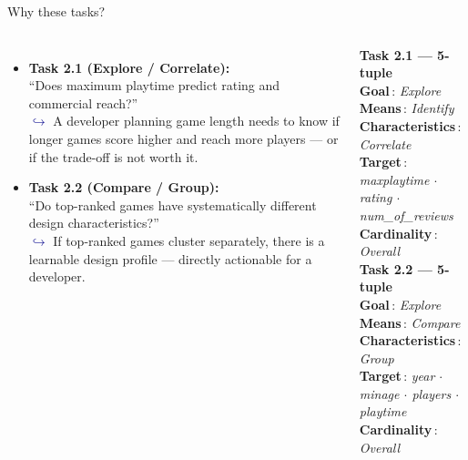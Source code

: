 \documentclass[aspectratio=169, 11pt]{beamer}
\newcommand{\tuplerow}[2]{%
  \textbf{#1}\,: \textit{#2}\\[1pt]%
}
\begin{document}
\begin{frame}[t]{Why these tasks?}

\begin{columns}[T]
  \begin{itemize}\setlength\itemsep{6pt}
    \item \textbf{Task 2.1 (Explore / Correlate):}\\
          ``Does maximum playtime predict rating and commercial reach?''\\
          \textcolor{darkblue}{$\hookrightarrow$} A developer planning game length needs to know if longer games score higher and reach more players — or if the trade-off is not worth it.

    \item \textbf{Task 2.2 (Compare / Group):}\\
          ``Do top-ranked games have systematically different design characteristics?''\\
          \textcolor{darkblue}{$\hookrightarrow$} If top-ranked games cluster separately, there is a learnable design profile — directly actionable for a developer.
  \end{itemize}

  \small
  \vspace{2pt}
  \textbf{Task 2.1 — 5-tuple}\\[2pt]
  \tuplerow{Goal}{Explore}
  \tuplerow{Means}{Identify}
  \tuplerow{Characteristics}{Correlate}
  \tuplerow{Target}{maxplaytime $\cdot$ rating $\cdot$ num\_of\_reviews}
  \tuplerow{Cardinality}{Overall}

  \vspace{8pt}
  \textbf{Task 2.2 — 5-tuple}\\[2pt]
  \tuplerow{Goal}{Explore}
  \tuplerow{Means}{Compare}
  \tuplerow{Characteristics}{Group}
  \tuplerow{Target}{year $\cdot$ minage $\cdot$ players $\cdot$ playtime}
  \tuplerow{Cardinality}{Overall}
\end{columns}

\end{frame}
\end{document}
